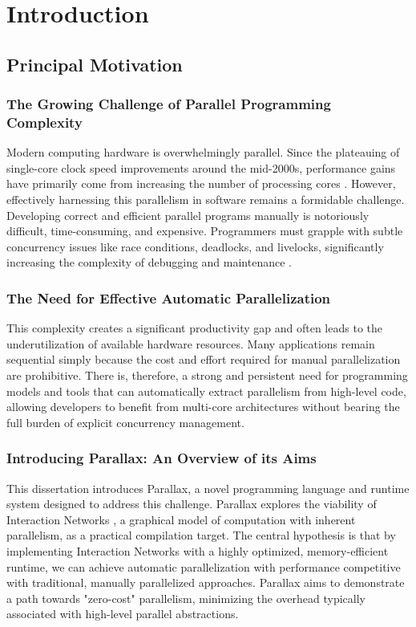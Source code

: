 \chapter{Introduction}

\section{Principal Motivation}

\subsection{The Growing Challenge of Parallel Programming Complexity}
Modern computing hardware is overwhelmingly parallel. Since the plateauing of single-core clock speed improvements around the mid-2000s, performance gains have primarily come from increasing the number of processing cores \cite{Asanovic2006TheLandscape}. However, effectively harnessing this parallelism in software remains a formidable challenge. Developing correct and efficient parallel programs manually is notoriously difficult, time-consuming, and expensive. Programmers must grapple with subtle concurrency issues like race conditions, deadlocks, and livelocks, significantly increasing the complexity of debugging and maintenance \cite{Lee2006TheProblem}.

\subsection{The Need for Effective Automatic Parallelization}
This complexity creates a significant productivity gap and often leads to the underutilization of available hardware resources. Many applications remain sequential simply because the cost and effort required for manual parallelization are prohibitive. There is, therefore, a strong and persistent need for programming models and tools that can automatically extract parallelism from high-level code, allowing developers to benefit from multi-core architectures without bearing the full burden of explicit concurrency management.

\subsection{Introducing Parallax: An Overview of its Aims}
This dissertation introduces Parallax, a novel programming language and runtime system designed to address this challenge. Parallax explores the viability of Interaction Networks \cite{Lafont1990InteractionNets}, a graphical model of computation with inherent parallelism, as a practical compilation target. The central hypothesis is that by implementing Interaction Networks with a highly optimized, memory-efficient runtime, we can achieve automatic parallelization with performance competitive with traditional, manually parallelized approaches. Parallax aims to demonstrate a path towards "zero-cost" parallelism, minimizing the overhead typically associated with high-level parallel abstractions.

